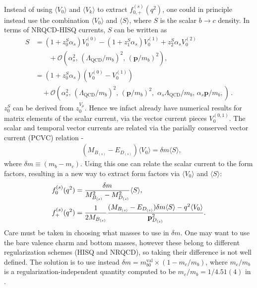 Instead of using $\langle V_0 \rangle$ and $\langle V_k \rangle$ to extract $f^{(s)}_{0,+}(q^2)$, one could in principle instead use the combination $\langle V_0 \rangle$ and $\langle S \rangle$, where $S$ is the scalar $b\to c$ density. In terms of NRQCD-HISQ currents, $S$ can be written as
\begin{align}
  S &= (1+z_0^S\alpha_s)V^{(0)}_0 - (1+z_1^S\alpha_s)V^{(1)}_0 + z_2^S\alpha_sV_0^{(2)}\\ \nonumber &\quad\quad + \mathcal{O}(\alpha_s^2,\, (\Lambda_{\text{QCD}}/m_b)^2,\, ({\textbf{p}}/m_b)^2 ), \\
  &= (1+z_0^S\alpha_s)( V^{(0)}_0 - V_0^{(1)} )  \\ \nonumber &\quad + \mathcal{O}(\alpha_s^2,\, (\Lambda_{\text{QCD}}/m_b)^2,\, ({\textbf{p}}/m_b)^2,\,\, \alpha_s \Lambda_{\text{QCD}} / m_b,\, \alpha_s {\textbf{p}}/m_b, )\,.
\end{align}
$z_0^S$ can be derived from $z_0^{V_{\mu}}$. Hence we infact already have numerical results for matrix elements of the scalar current, via the vector current pieces $V^{(0,1)}_0$. The scalar and temporal vector currents are related via the parially conserved vector current (PCVC) relation -
\begin{align}
  &(M_{B_{(s)}}-E_{D_{(s)}})\langle V_0 \rangle = \delta m \langle S \rangle,
\end{align}
where $\delta m \equiv (m_b-m_c)$. Using this one can relate the scalar current to the form factors, resulting in a new way to extract form factors via $\langle V_0 \rangle$ and $\langle S \rangle$:
\begin{align}
  f_0^{(s)}(q^2) &= {\delta m\over M_{B_{(s)}}^2 - M_{D_{(s)}}^2 } \langle S \rangle, \\
  f_+^{(s)}(q^2) &= {1\over 2M_{B_{(s)}}} { (M_{B_{(s)}}-E_{D_{(s)}}) \delta m \langle S \rangle - q^2 \langle V_0 \rangle \over {\bf{p}}^2_{D_{(s)}}}. \label{eq:fplus_badness}
\end{align}
Care must be taken in choosing what masses to use in $\delta m$. One may want to use the bare valence charm and bottom masses, however these belong to different regularization schemes (HISQ and NRQCD), so taking their difference is not well defined. The solution is to use instead $\delta m = m^{\text{val}}_{b0} \times ( 1 - m_c/m_b)$, where $m_c/m_b$ is a regularization-independent quantity computed to be $m_c/m_b = 1/4.51(4)$ in \cite{McNeile:2010ji}.

